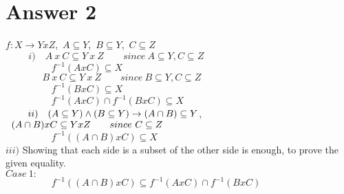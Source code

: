\documentclass[12pt]{article}
\begin{document}
\vspace{1cm}
\section*{Answer 2} 
$f:X \rightarrow YxZ$,\  $A \subseteq Y$,\  $B \subseteq Y$,\  $C \subseteq Z$  \vspace{0.3cm}\\
\vspace{0.1cm}
$\hspace{1cm}i)\quad A\ x\ C \subseteq Y\ x\ Z \qquad since\ A \subseteq Y, C \subseteq Z$\\
\vspace{0.1cm}
$\hspace{2cm}f^{-1}(AxC) \subseteq X$ \vspace{0.1cm}\\
\vspace{0.1cm}
$\hspace{1cm}\ \ \quad B\ x\ C \subseteq Y\ x\ Z \qquad since\ B \subseteq Y, C \subseteq Z$\\
\vspace{0.1cm}
$\hspace{2cm}f^{-1}(BxC) \subseteq X$\\
\vspace{0.1cm}
$\hspace{2cm}f^{-1}(AxC)  \cap f^{-1}(BxC) \subseteq X$ \vspace{0.3cm}\\
\vspace{0.1cm}
$\hspace{0.8cm}ii)\quad (A \subseteq Y) \land (B \subseteq Y) \rightarrow (A \cap B) \subseteq Y$, $\hspace{0.2cm}(A \cap B)xC \subseteq YxZ \qquad since\ C \subseteq Z$ \vspace{0.1cm}\\
\vspace{0.1cm}
$\hspace{2cm}f^{-1}((A \cap B)xC) \subseteq X$ \vspace{0.3cm}\\
\vspace{0.1cm}
\hspace{0.65cm}$iii)$ Showing that each side is a subset of the other side is enough, to prove the given equality. \\
$Case\ 1:$ \\
\vspace{0.1cm}
$\hspace{2cm}f^{-1}((A \cap B)xC) \subseteq f^{-1}(AxC)\cap f^{-1}(BxC)$ \\
\end{document}
